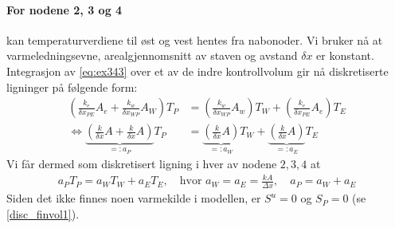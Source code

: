 \paragraph{For nodene 2, 3 og 4} kan temperaturverdiene til øst og vest hentes fra nabonoder. Vi bruker nå at varmeledningsevne, arealgjennomsnitt av staven og avstand $\delta x$ er konstant. Integrasjon av \eqref{eq:ex343} over et av de indre kontrollvolum gir nå diskretiserte ligninger på følgende form:
\begin{align*}
\left(\frac{k_e}{\delta x_{PE}}A_e + \frac{k_w}{\delta x_{WP}}A_W \right)T_P &=\left(\frac{k_w}{\delta x_{WP}}A_w\right) T_W + \left(\frac{k_e}{\delta x_{PE}}A_e\right) T_E  \\
\Leftrightarrow \underbrace{\left(\frac{k}{\delta x}A + \frac{k}{\delta x}A\right)}_{=:a_P}T_P &=\underbrace{\left(\frac{k}{\delta x}A\right)}_{=:a_W} T_W + \underbrace{\left(\frac{k}{\delta x}A\right)}_{=:a_E} T_E
\end{align*}
Vi får dermed som diskretisert ligning i hver av nodene $2,3,4$ at
\begin{align}
a_P T_P = a_W T_W + a_E T_E,\quad \text{hvor } a_W = a_E = \frac{kA}{\Delta x}, \quad a_P = a_W + a_E
\end{align}
Siden det ikke finnes noen varmekilde i modellen, er $S^u = 0$ og $S_P = 0$ (se \eqref{disc_finvol1}).


